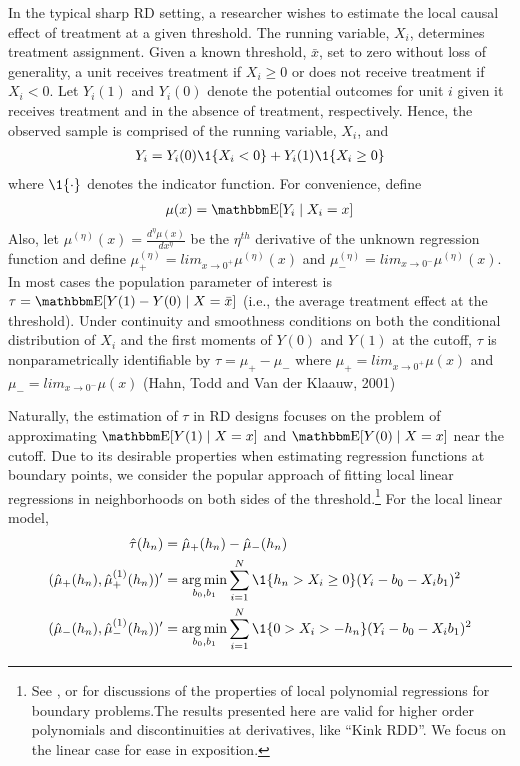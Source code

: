 \documentclass[12pt,fleqn]{article}
\begin{document}
In the typical sharp RD setting, a researcher wishes to estimate the local 
causal effect of treatment at a given threshold. The running variable, $X_{i}$, 
determines treatment assignment.  Given a known threshold, $\bar{x}$, set to 
zero without loss of generality, a unit receives treatment if $X_{i} \geq 0$ or 
does not receive treatment if $X_{i} < 0$. Let $Y_{i}(1)$ and $Y_{i}(0)$ denote 
the potential outcomes for unit $i$ given it receives treatment and
 in the absence of treatment, respectively. Hence, the observed sample is 
 comprised of the running variable, $X_{i}$, and
 \begin{align}
  Y_{i}=Y_{i}(0) \1\{X_{i}<0\}+Y_{i}(1) \1\{X_{i} \geq 0\}
 \end{align}
where $\1\{ \cdot\}$ denotes the indicator function. For convenience,
define
 \begin{align}
  \mu(x)= \E[Y_{i} \mid X_{i}=x]
 \end{align}
Also, let $\mu^{(\eta)}(x)=\frac{d^{\eta}\mu(x)}{dx^{\eta}}$ be the $\eta^{th}$ 
derivative of the unknown regression function and define 
$\mu^{(\eta)}_{+}=lim_{x \rightarrow 0^{+}}\mu^{(\eta)}(x)$ and 
$\mu^{(\eta)}_{-}=lim_{x \rightarrow 0^{-}}\mu^{(\eta)}(x)$.
In most cases the population parameter of interest is 
$\tau=\E[Y(1)-Y(0) \mid X=\bar{x}]$ (i.e., the average treatment effect
at the threshold). Under continuity and smoothness conditions on both the 
conditional distribution of $X_i$ and the first moments of $Y(0)$ and $Y(1)$ at
the cutoff, $\tau$ is nonparametrically identifiable by
$\tau = \mu_{+}- \mu_{-}$
where $\mu_{+}=lim_{x \rightarrow 0^{+}}\mu(x)$ and
$\mu_{-}=lim_{x \rightarrow 0^{-}}\mu(x)$
(Hahn, Todd and Van der Klaauw, 2001)

Naturally, the estimation of $\tau$ in RD designs focuses on the 
problem of approximating $\E[Y(1) \mid X=x]$ and $\E[Y(0) \mid X=x]$
near the cutoff. Due to its desirable properties when estimating regression 
functions at boundary points, we consider the popular approach of fitting 
local linear regressions in neighborhoods on both
sides of the threshold.\footnote{See \cite{HTV2001}, \cite{Porter03} or
\cite{FanGijbels92} for discussions of the properties of local polynomial 
regressions for boundary problems.The results presented here are valid for
higher order polynomials and discontinuities at derivatives, like ``Kink RDD''. We focus on the linear case for ease in exposition.}
For the local linear model,
\begin{align*}
 \hat{\tau}(h_{n})&=\hat {\mu}_{+}(h_{n}) -\hat{\mu}_{-}(h_{n})\\
(\hat {\mu}_{+}(h_{n}),\hat {\mu}^{(1)}_{+}(h_{n}))'&= \argmin_{b_{0},b_{1}}
\sum_{i=1}^{N}\1\{h_n > X_{i} \geq 0\}(Y_{i}-b_{0}-X_{i}b_{1})^{2} \\
(\hat {\mu}_{-}(h_{n}),\hat {\mu}^{(1)}_{-}(h_{n}))' &= \argmin_{b_{0},b_{1}}
\sum_{i=1}^{N}\1\{0 > X_{i} > -h_n \}(Y_{i}-b_{0}-X_{i}b_{1})^{2}
\end{align*}
\end{document}
